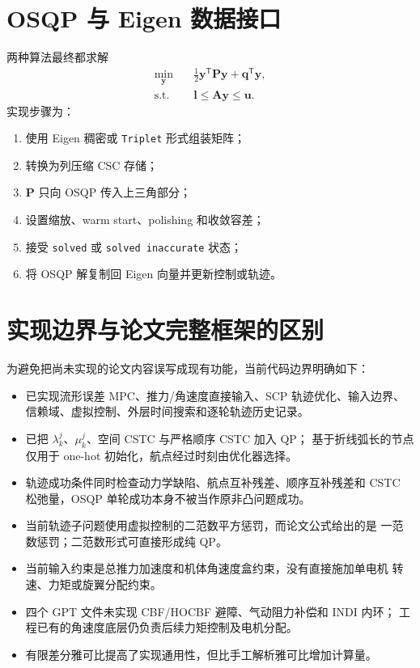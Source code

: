 \documentclass[UTF8,a4paper,11pt]{ctexart}
\begin{document}
\section{OSQP 与 Eigen 数据接口}

两种算法最终都求解
\begin{equation}
  \begin{aligned}
  \min_{\bm y}\quad &\frac12\bm y^\mathsf T\bm P\bm y+\bm q^\mathsf T\bm y,\\
  \text{s.t.}\quad &\bm l\leq\bm A\bm y\leq\bm u.
  \end{aligned}
\end{equation}
实现步骤为：
\begin{enumerate}
  \item 使用 Eigen 稠密或 \texttt{Triplet} 形式组装矩阵；
  \item 转换为列压缩 CSC 存储；
  \item $\bm P$ 只向 OSQP 传入上三角部分；
  \item 设置缩放、warm start、polishing 和收敛容差；
  \item 接受 \texttt{solved} 或 \texttt{solved inaccurate} 状态；
  \item 将 OSQP 解复制回 Eigen 向量并更新控制或轨迹。
\end{enumerate}

\section{实现边界与论文完整框架的区别}

为避免把尚未实现的论文内容误写成现有功能，当前代码边界明确如下：
\begin{itemize}
  \item 已实现流形误差 MPC、推力/角速度直接输入、SCP 轨迹优化、输入边界、
  信赖域、虚拟控制、外层时间搜索和逐轮轨迹历史记录。
  \item 已把 $\lambda_k^j$、$\mu_k^j$、空间 CSTC 与严格顺序 CSTC 加入 QP；
  基于折线弧长的节点仅用于 one-hot 初始化，航点经过时刻由优化器选择。
  \item 轨迹成功条件同时检查动力学缺陷、航点互补残差、顺序互补残差和
  CSTC 松弛量，OSQP 单轮成功本身不被当作原非凸问题成功。
  \item 当前轨迹子问题使用虚拟控制的二范数平方惩罚，而论文公式给出的是
  一范数惩罚；二范数形式可直接形成纯 QP。
  \item 当前输入约束是总推力加速度和机体角速度盒约束，没有直接施加单电机
  转速、力矩或旋翼分配约束。
  \item 四个 GPT 文件未实现 CBF/HOCBF 避障、气动阻力补偿和 INDI 内环；
  工程已有的角速度底层仍负责后续力矩控制及电机分配。
  \item 有限差分雅可比提高了实现通用性，但比手工解析雅可比增加计算量。
\end{itemize}
\end{document}
